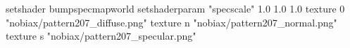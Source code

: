 setshader bumpspecmapworld
setshaderparam "specscale" 1.0 1.0 1.0
   texture 0 "nobiax/pattern207_diffuse.png"
   texture n "nobiax/pattern207_normal.png"
   texture s "nobiax/pattern207_specular.png"